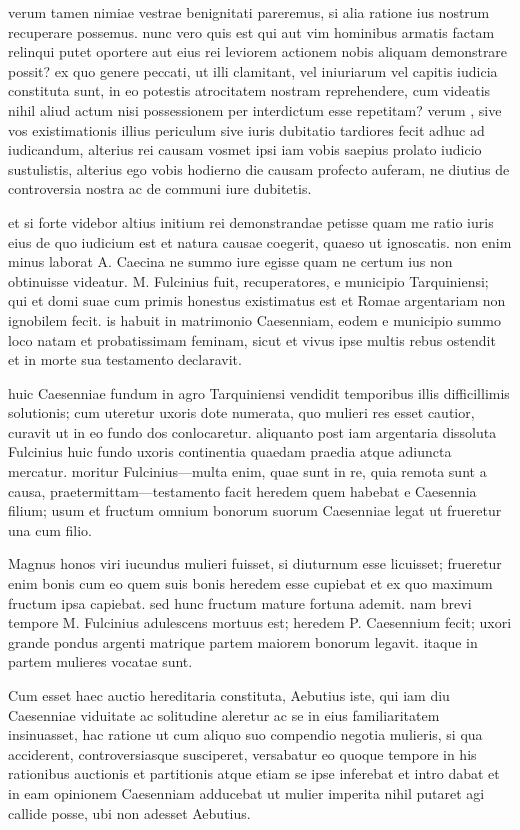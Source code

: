  verum tamen nimiae vestrae benignitati pareremus, si alia ratione ius nostrum recuperare possemus. nunc vero quis est qui aut vim hominibus armatis factam relinqui putet oportere aut eius rei leviorem actionem nobis aliquam demonstrare possit? ex quo genere peccati, ut illi clamitant, vel iniuriarum vel capitis iudicia constituta sunt, in eo potestis atrocitatem nostram reprehendere, cum videatis nihil aliud actum nisi possessionem per interdictum esse repetitam? verum , sive vos existimationis illius periculum sive iuris dubitatio tardiores fecit adhuc ad iudicandum, alterius rei causam vosmet ipsi iam vobis saepius prolato iudicio sustulistis, alterius ego vobis hodierno die causam profecto auferam, ne diutius de controversia nostra ac de communi iure dubitetis.

 et si forte videbor altius initium rei demonstrandae petisse quam me ratio iuris eius de quo iudicium est et natura causae coegerit, quaeso ut ignoscatis. non enim minus laborat A. Caecina ne summo iure egisse quam ne certum ius non obtinuisse videatur. M. Fulcinius fuit, recuperatores, e municipio Tarquiniensi; qui et domi suae cum primis honestus existimatus est et Romae argentariam non ignobilem fecit. is habuit in matrimonio Caesenniam, eodem e municipio summo loco natam et probatissimam feminam, sicut et vivus ipse multis rebus ostendit et in morte sua testamento declaravit.

 huic Caesenniae fundum in agro Tarquiniensi vendidit temporibus illis difficillimis solutionis; cum uteretur uxoris dote numerata, quo mulieri res esset cautior, curavit ut in eo fundo dos conlocaretur. aliquanto post iam argentaria dissoluta Fulcinius huic fundo uxoris continentia quaedam praedia atque adiuncta mercatur. moritur Fulcinius—multa enim, quae sunt in re, quia remota sunt a causa, praetermittam—testamento facit heredem quem habebat e Caesennia filium; usum et fructum omnium bonorum suorum Caesenniae legat ut frueretur una cum filio.

 Magnus honos viri iucundus mulieri fuisset, si diuturnum esse licuisset; frueretur enim bonis cum eo quem suis bonis heredem esse cupiebat et ex quo maximum fructum ipsa capiebat. sed hunc fructum mature fortuna ademit. nam brevi tempore M. Fulcinius adulescens mortuus est; heredem P. Caesennium fecit; uxori grande pondus argenti matrique partem maiorem bonorum legavit. itaque in partem mulieres vocatae sunt.

 Cum esset haec auctio hereditaria constituta, Aebutius iste, qui iam diu Caesenniae viduitate ac solitudine aleretur ac se in eius familiaritatem insinuasset, hac ratione ut cum aliquo suo compendio negotia mulieris, si qua acciderent, controversiasque susciperet, versabatur eo quoque tempore in his rationibus auctionis et partitionis atque etiam se ipse inferebat et intro dabat et in eam opinionem Caesenniam adducebat ut mulier imperita nihil putaret agi callide posse, ubi non adesset Aebutius.

